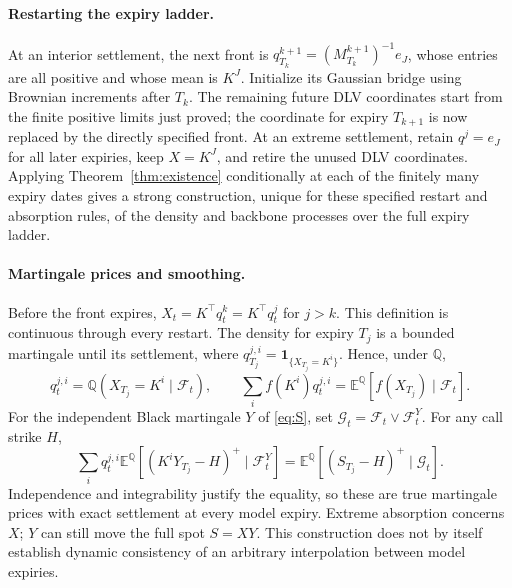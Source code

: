 \documentclass[11pt]{article}
\newcommand{\E}{\mathbb E}
\newcommand{\Q}{\mathbb Q}
\newcommand{\one}{\mathbf 1}
\theoremstyle{plain}
\theoremstyle{definition}
\theoremstyle{remark}
\begin{document}
\paragraph{Restarting the expiry ladder.}
At an interior settlement, the next front is
$q_{T_k}^{k+1}=(M_{T_k}^{k+1})^{-1}e_J$, whose entries are all positive
and whose mean is $K^J$. Initialize its Gaussian bridge using Brownian
increments after $T_k$. The remaining future DLV coordinates start
from the finite positive limits just proved; the coordinate for expiry
$T_{k+1}$ is now replaced by the directly specified front. At an extreme
settlement, retain $q^j=e_J$ for all later expiries, keep $X=K^J$, and
retire the unused DLV coordinates. Applying Theorem~\ref{thm:existence}
conditionally at each of the finitely many expiry dates gives a strong
construction, unique for these specified restart and absorption rules,
of the density and backbone processes over the full expiry ladder.

\paragraph{Martingale prices and smoothing.}
Before the front expires, $X_t=K^\top q_t^k=K^\top q_t^j$ for $j>k$.
This definition is continuous through every restart. The density for
expiry $T_j$ is a bounded martingale until its settlement, where
$q_{T_j}^{j,i}=\one_{\{X_{T_j}=K^i\}}$. Hence, under $\Q$,
\begin{equation}\label{eq:exist-conditional-law}
 q_t^{j,i}=\Q(X_{T_j}=K^i\mid\mathcal F_t),\qquad
 \sum_i f(K^i)q_t^{j,i}=\E^\Q[f(X_{T_j})\mid\mathcal F_t].
\end{equation}
For the independent Black martingale $Y$ of \eqref{eq:S}, set
$\mathcal G_t=\mathcal F_t\vee\mathcal F_t^Y$. For any call strike $H$,
\begin{equation}\label{eq:exist-smoothed-call}
 \sum_i q_t^{j,i}\E^\Q[(K^iY_{T_j}-H)^+\mid\mathcal F_t^Y]
 =\E^\Q[(S_{T_j}-H)^+\mid\mathcal G_t].
\end{equation}
Independence and integrability justify the equality, so these are true
martingale prices with exact settlement at every model expiry. Extreme
absorption concerns $X$; $Y$ can still move the full spot $S=XY$.
This construction does not by itself establish dynamic consistency of
an arbitrary interpolation between model expiries.
\end{document}
